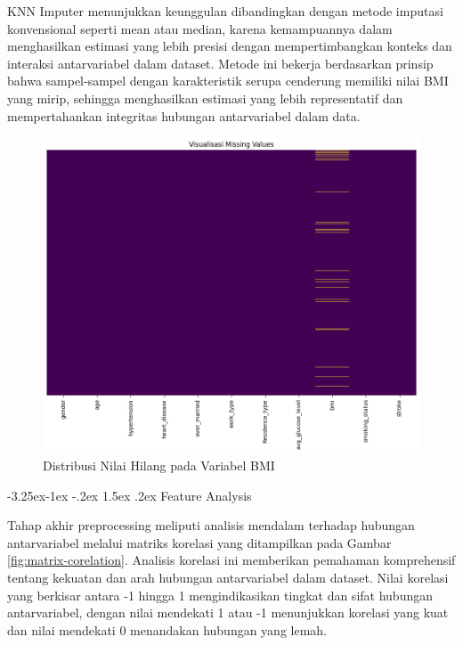 \documentclass[10pt]{article}
\makeatletter
\renewcommand\subsubsection{\@startsection{subsubsection}{3}{\z@}%
  {-3.25ex\@plus -1ex \@minus -.2ex}%
  {1.5ex \@plus .2ex}%
  {\normalfont\itshape\normalsize}}
\makeatother
\begin{document}
\begin{multicols}{2}
    KNN Imputer menunjukkan keunggulan dibandingkan dengan metode imputasi
    konvensional seperti mean atau median, karena kemampuannya dalam menghasilkan
    estimasi yang lebih presisi dengan mempertimbangkan konteks dan interaksi
    antarvariabel dalam dataset. Metode ini bekerja berdasarkan prinsip bahwa
    sampel-sampel dengan karakteristik serupa cenderung memiliki nilai BMI yang
    mirip, sehingga menghasilkan estimasi yang lebih representatif dan
    mempertahankan integritas hubungan antarvariabel dalam data.

    \begin{figure}[H]
        \includegraphics[width=\columnwidth]{./assets/missing-value.png}
        \caption{Distribusi Nilai Hilang pada Variabel BMI}%
        \label{fig:missing-value}
    \end{figure}

    \subsubsection{Feature Analysis}

    Tahap akhir preprocessing meliputi analisis mendalam terhadap hubungan
    antarvariabel melalui matriks korelasi yang ditampilkan pada Gambar
    \ref{fig:matrix-corelation}. Analisis korelasi ini memberikan pemahaman
    komprehensif tentang kekuatan dan arah hubungan antarvariabel dalam dataset.
    Nilai korelasi yang berkisar antara -1 hingga 1 mengindikasikan tingkat dan
    sifat hubungan antarvariabel, dengan nilai mendekati 1 atau -1 menunjukkan
    korelasi yang kuat dan nilai mendekati 0 menandakan hubungan yang lemah.


\end{multicols}
\end{document}
